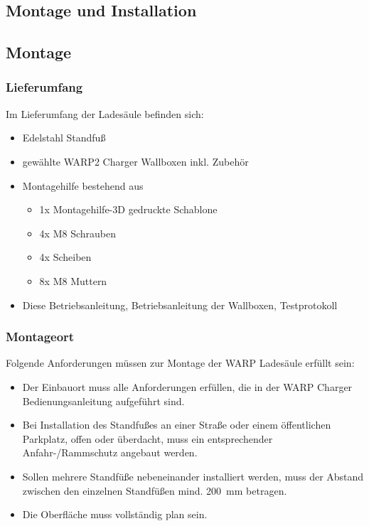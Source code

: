 \documentclass[a4paper,10pt]{article}
\begin{document}
\begin{multicols*}{2}
	\section{Montage und Installation}
	\subsection{Montage}
	\subsubsection{Lieferumfang}
	Im Lieferumfang der Ladesäule befinden sich:
	\begin{itemize}
		\item Edelstahl Standfuß
		\item gewählte WARP2 Charger Wallboxen inkl. Zubehör
		\item Montagehilfe bestehend aus
			\begin{itemize}
				\item 1x Montagehilfe-3D gedruckte Schablone
				\item 4x M8 Schrauben
				\item 4x Scheiben
				\item 8x M8 Muttern
			\end{itemize}
		\item Diese Betriebsanleitung, Betriebsanleitung der Wallboxen,
		Testprotokoll
	\end{itemize}

	\subsubsection{Montageort}

	Folgende Anforderungen müssen zur Montage der WARP Ladesäule erfüllt sein:
	\begin{itemize}
		\item Der Einbauort muss alle Anforderungen erfüllen, die in der
		WARP Charger Bedienungsanleitung aufgeführt sind.
		\item Bei Installation des Standfußes an einer Straße oder einem
		öffentlichen Parkplatz, offen oder überdacht, muss ein entsprechender
		Anfahr-/Rammschutz angebaut werden.
		\item Sollen mehrere Standfüße nebeneinander installiert werden, muss
		der Abstand zwischen den einzelnen Standfüßen mind. \SI{200}{\milli\meter} betragen.
		\item Die Oberfläche muss vollständig plan sein.
	\end{itemize}


\end{multicols*}
\end{document}
